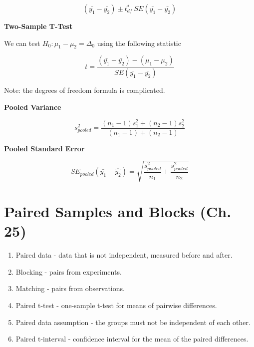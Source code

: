 \documentclass{article}
\theoremstyle{definition}
\begin{document}
\begin{equation}
    (\bar{y_1} - \bar{y_2}) \pm t_{df}^*\ SE(\bar{y_1} - \bar{y_2})
\end{equation}

\vspace{2ex}
\textbf{Two-Sample T-Test}

We can test $H_0: \mu_1 - \mu_2 = \Delta_0$ using the following statistic

\begin{equation}
    t = \frac{(\bar{y_1} - \bar{y_2}) - (\mu_1 - \mu_2)}{SE(\bar{y_1} - \bar{y_2})}
\end{equation}

Note: the degrees of freedom formula is complicated.

\vspace{2ex}
\textbf{Pooled Variance}

\begin{equation}
    s_{pooled}^2 = \frac{(n_1 - 1) s_1^2 + (n_2 - 1) s_2^2}{(n_1 - 1) + (n_2 - 1)}
\end{equation}

\vspace{2ex}
\textbf{Pooled Standard Error}

\begin{equation}
    SE_{pooled}(\bar{y_1} - \hat{y_2}) = \sqrt{\frac{s_{pooled}^2}{n_1} + \frac{s_{pooled}^2}{n_2}}
\end{equation}

\pagebreak

\section{Paired Samples and Blocks (Ch. 25)}

\begin{enumerate}[label=\textbf{\roman*.}]
    \item Paired data - data that is not independent, measured before and after.

    \item Blocking - pairs from experiments.

    \item Matching - pairs from observations.

    \item Paired t-test - one-sample t-test for means of pairwise differences.

    \item Paired data assumption - the groups must not be independent of each other.

    \item Paired t-interval - confidence interval for the mean of the paired differences.

\end{enumerate}
\end{document}
